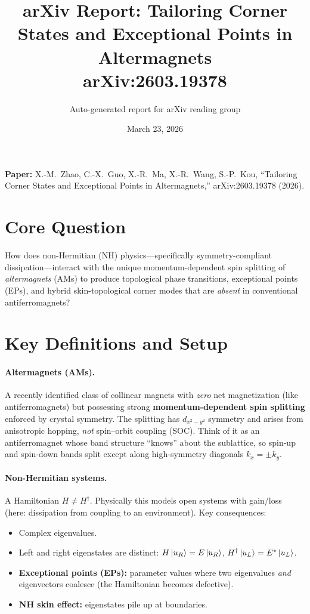 \documentclass[11pt,a4paper]{article}
\title{arXiv Report: Tailoring Corner States and Exceptional Points in Altermagnets\\[6pt]
\large arXiv:2603.19378}
\author{Auto-generated report for arXiv reading group}
\date{March 23, 2026}
\begin{document}
\maketitle

\noindent\textbf{Paper:} X.-M.\ Zhao, C.-X.\ Guo, X.-R.\ Ma, X.-R.\ Wang, S.-P.\ Kou,
``Tailoring Corner States and Exceptional Points in Altermagnets,'' arXiv:2603.19378 (2026).

\section{Core Question}

How does non-Hermitian (NH) physics---specifically symmetry-compliant dissipation---interact with the unique momentum-dependent spin splitting of \emph{altermagnets} (AMs) to produce topological phase transitions, exceptional points (EPs), and hybrid skin-topological corner modes that are \emph{absent} in conventional antiferromagnets?

\section{Key Definitions and Setup}

\paragraph{Altermagnets (AMs).}
A recently identified class of collinear magnets with \emph{zero} net magnetization (like antiferromagnets) but possessing strong \textbf{momentum-dependent spin splitting} enforced by crystal symmetry.
The splitting has $d_{x^2-y^2}$ symmetry and arises from anisotropic hopping, \emph{not} spin--orbit coupling (SOC).
Think of it as an antiferromagnet whose band structure ``knows'' about the sublattice, so spin-up and spin-down bands split except along high-symmetry diagonals $k_x = \pm k_y$.

\paragraph{Non-Hermitian systems.}
A Hamiltonian $H \neq H^\dagger$.  Physically this models open systems with gain/loss (here: dissipation from coupling to an environment).  Key consequences:
\begin{itemize}[nosep]
  \item Complex eigenvalues.
  \item Left and right eigenstates are distinct: $H\ket{u_R} = E\ket{u_R}$, $H^\dagger\ket{u_L} = E^*\ket{u_L}$.
  \item \textbf{Exceptional points (EPs):} parameter values where two eigenvalues \emph{and} eigenvectors coalesce (the Hamiltonian becomes defective).
  \item \textbf{NH skin effect:} eigenstates pile up at boundaries.
\end{itemize}
\end{document}
